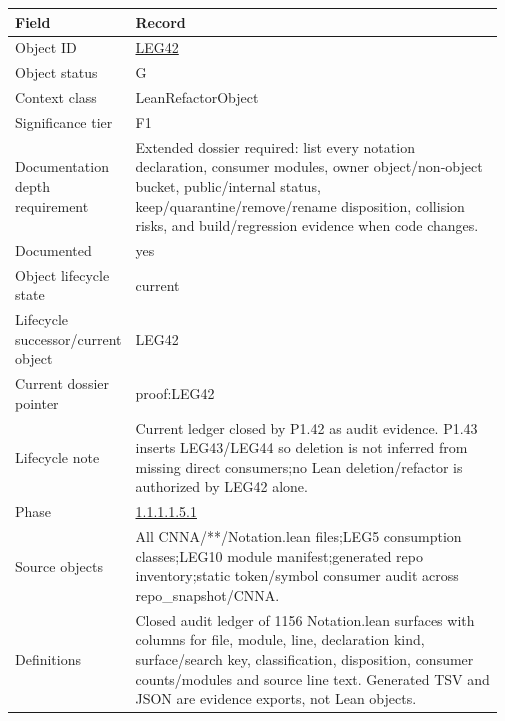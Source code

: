 \begin{longtable}{L{0.16\linewidth} L{0.81\linewidth}}
\hline
\textbf{Field} & \textbf{Record}\\
\hline
Object ID & \hyperlink{object-row-LEG42}{LEG42}\\
\hline\addlinespace[0.20em]
Object status & G\\
\hline\addlinespace[0.20em]
Context class & LeanRefactorObject\\
\hline\addlinespace[0.20em]
Significance tier & F1\\
\hline\addlinespace[0.20em]
Documentation depth requirement & Extended dossier required: list every notation declaration, consumer modules, owner object/\allowbreak{}non-object bucket, public/\allowbreak{}internal status, keep/\allowbreak{}quarantine/\allowbreak{}remove/\allowbreak{}rename disposition, collision risks, and build/\allowbreak{}regression evidence when code changes.\\
\hline\addlinespace[0.20em]
Documented & yes\\
\hline\addlinespace[0.20em]
Object lifecycle state & current\\
\hline\addlinespace[0.20em]
Lifecycle successor/\allowbreak{}current object & LEG42\\
\hline\addlinespace[0.20em]
Current dossier pointer & proof:LEG42\\
\hline\addlinespace[0.20em]
Lifecycle note & Current ledger closed by P1.42 as audit evidence. P1.43 inserts LEG43/\allowbreak{}LEG44 so deletion is not inferred from missing direct consumers;\newline no Lean deletion/\allowbreak{}refactor is authorized by LEG42 alone.\\
\hline\addlinespace[0.20em]
Phase & \hyperlink{phase-row-1-1-1-1-5-1}{1.1.1.1.5.1}\\
\hline\addlinespace[0.20em]
Source objects & All CNNA/\allowbreak{}**/\allowbreak{}Notation.lean files;\newline LEG5 consumption classes;\newline LEG10 module manifest;\newline generated repo inventory;\newline static token/\allowbreak{}symbol consumer audit across repo\_snapshot/\allowbreak{}CNNA.\\
\hline\addlinespace[0.20em]
Definitions & Closed audit ledger of 1156 Notation.lean surfaces with columns for file, module, line, declaration kind, surface/\allowbreak{}search key, classification, disposition, consumer counts/\allowbreak{}modules and source line text. Generated TSV and JSON are evidence exports, not Lean objects.\\

\end{longtable}

